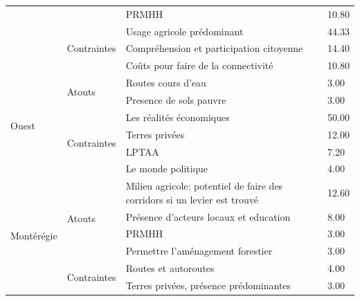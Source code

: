 \begin{table}[h!]
\begin{tabular}{m{}lm{}l}
                       &                              & PRMHH                                               & 10.80 \\ \cline{2-4} 
                       & \multirow{3}{*}{Contraintes} & Usage agricole prédominant                          & 44.33 \\ \cline{3-4} 
                       &                              & Compréhension et participation citoyenne            & 14.40 \\ \cline{3-4} 
                       &                              & Coûts pour faire de la connectivité                 & 10.80 \\ \hline
\multirow{6}{*}{Ouest} & \multirow{2}{*}{Atouts}      & Routes cours d'eau                                  & 3.00  \\ \cline{3-4} 
                       &                              & Presence de sols pauvre                             & 3.00  \\ \cline{2-4} 
                       & \multirow{4}{*}{Contraintes} & Les réalités économiques                            & 50.00 \\ \cline{3-4} 
                       &                              & Terres privées                                      & 12.00 \\ \cline{3-4} 
                       &                              & LPTAA                                               & 7.20  \\ \cline{3-4} 
                       &                              & Le monde politique                                  & 4.00  \\ \hline
\multirow{6}{*}{Montérégie} &
  \multirow{4}{*}{Atouts} &
  Milieu agricole: potentiel de faire des corridors si un levier est trouvé &
  12.60 \\ \cline{3-4} 
                       &                              & Présence d'acteurs locaux et education              & 8.00  \\ \cline{3-4} 
                       &                              & PRMHH                                               & 3.00  \\ \cline{3-4} 
                       &                              & Permettre l'aménagement forestier                   & 3.00  \\ \cline{2-4} 
                       & \multirow{2}{*}{Contraintes} & Routes et autoroutes                                & 4.00  \\ \cline{3-4} 
                       &                              & Terres privées, présence prédominantes              & 3.00  \\ \hline
\end{tabular}
\end{table}

